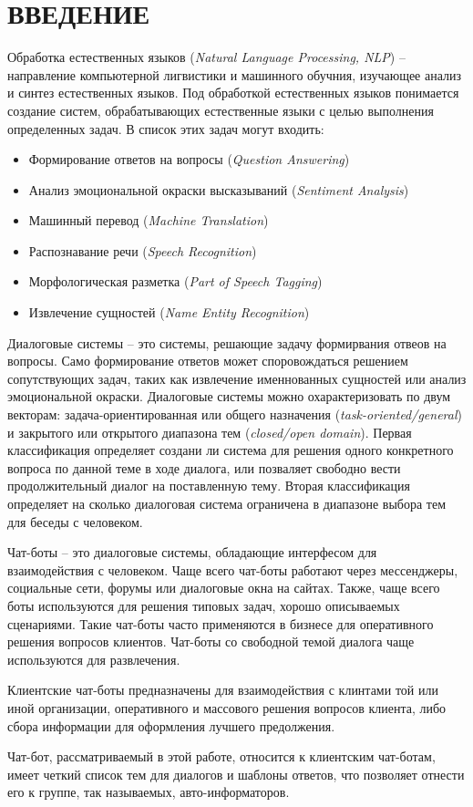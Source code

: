 \section*{ВВЕДЕНИЕ}
Обработка естественных языков (\textit{Natural Language Processing, NLP})
-- направление компьютерной лигвистики и машинного обучния,
изучающее анализ и синтез естественных языков.
Под обработкой естественных языков  понимается создание систем,
обрабатывающих естественные языки с целью выполнения определенных задач.
В список этих задач могут входить:
\begin{itemize}
    \item Формирование ответов на вопросы (\textit{Question Answering})
    \item Анализ эмоциональной окраски высказываний (\textit{Sentiment Analysis})
    \item Машинный перевод (\textit{Machine Translation})
    \item Распознавание речи (\textit{Speech Recognition})
    \item Морфологическая разметка (\textit{Part of Speech Tagging})
    \item Извлечение сущностей (\textit{Name Entity Recognition})
\end{itemize}

Диалоговые системы -- это системы, решающие задачу формирвания отвеов на вопросы.
Само формирование ответов может споровождаться решением сопутствующих задач, таких как
извлечение именнованных сущностей или анализ эмоциональной окраски.
Диалоговые системы можно охарактеризовать по двум векторам:
задача-ориентированная или общего назначения (\textit{task-oriented/general})
и закрытого или открытого диапазона тем (\textit{closed/open domain}).
Первая классификация определяет создани ли система для решения одного конкретного
вопроса по данной теме в ходе диалога, или позваляет свободно вести продолжительный
диалог на поставленную тему.
Вторая классификация определяет на сколько диалоговая система ограничена в диапазоне выбора тем
для беседы с человеком.

Чат-боты -- это диалоговые системы, обладающие интерфесом для взаимодействия с человеком.
Чаще всего чат-боты работают через мессенджеры, социальные сети, форумы или диалоговые окна на сайтах.
Также, чаще всего боты используются для решения типовых задач, хорошо описываемых сценариями.
Такие чат-боты часто применяются в бизнесе для оперативного решения вопросов клиентов.
Чат-боты со свободной темой диалога чаще используются для развлечения.

Клиентские чат-боты предназначены для взаимодействия с клинтами той или иной организации,
оперативного и массового решения вопросов клиента, либо сбора информации
для оформления лучшего предолжения.

Чат-бот, рассматриваемый в этой работе, относится к клиентским чат-ботам,
имеет четкий список тем для диалогов и шаблоны ответов, что позволяет отнести
его к группе, так называемых, авто-информаторов.
